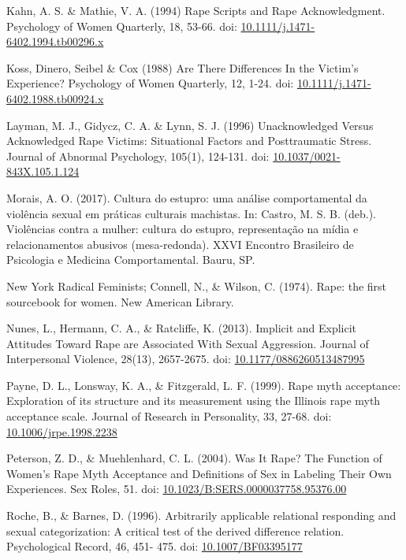 \hangindent=25pt
\noindent Kahn, A. S. \& Mathie, V. A. (1994) Rape Scripts and Rape Acknowledgment. Psychology of Women Quarterly, 18, 53-66. doi: \url{10.1111/j.1471-6402.1994.tb00296.x}

\hangindent=25pt
\noindent Koss, Dinero, Seibel \& Cox (1988) Are There Differences In the Victim's Experience? Psychology of Women Quarterly, 12, 1-24. doi: \url{10.1111/j.1471-6402.1988.tb00924.x}

\hangindent=25pt
\noindent Layman, M. J., Gidycz, C. A. \& Lynn, S. J. (1996) Unacknowledged Versus Acknowledged Rape Victims: Situational Factors and Posttraumatic Stress. Journal of Abnormal Psychology, 105(1), 124-131. doi: \url{10.1037/0021-843X.105.1.124}

\hangindent=25pt
\noindent Morais, A. O. (2017). Cultura do estupro: uma análise comportamental da violência sexual em práticas culturais machistas. In: Castro, M. S. B. (deb.). Violências contra a mulher: cultura do estupro, representação na mídia e relacionamentos abusivos (mesa-redonda). XXVI Encontro Brasileiro de Psicologia e Medicina Comportamental. Bauru, SP.

\hangindent=25pt
\noindent New York Radical Feminists; Connell, N., \& Wilson, C. (1974). Rape: the first sourcebook for women. New American Library. 

\hangindent=25pt
\noindent Nunes, L., Hermann, C. A., \& Ratcliffe, K. (2013). Implicit and Explicit Attitudes Toward Rape are Associated With Sexual Aggression. Journal of Interpersonal Violence, 28(13), 2657-2675. doi: \url{10.1177/0886260513487995}

\hangindent=25pt
\noindent Payne, D. L., Lonsway, K. A., \& Fitzgerald, L. F. (1999). Rape myth acceptance: Exploration of its structure and its measurement using the Illinois rape myth acceptance scale. Journal of Research in Personality, 33, 27-68. doi: \url{10.1006/jrpe.1998.2238}

\hangindent=25pt
\noindent Peterson, Z. D., \& Muehlenhard, C. L. (2004). Was It Rape? The Function of Women’s Rape Myth Acceptance and Definitions of Sex in Labeling Their Own Experiences. Sex Roles, 51. doi: \url{10.1023/B:SERS.0000037758.95376.00}

\hangindent=25pt
\noindent Roche, B., \& Barnes, D. (1996). Arbitrarily applicable relational responding and sexual categorization: A critical test of the derived difference relation. Psychological Record, 46, 451- 475. doi: \url{10.1007/BF03395177}

